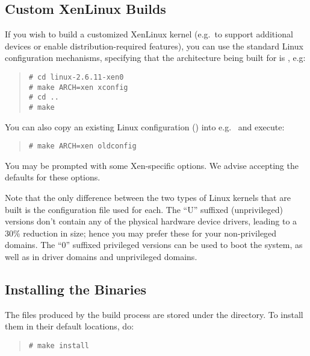 \subsection{Custom XenLinux Builds}


If you wish to build a customized XenLinux kernel (e.g.\ to support
additional devices or enable distribution-required features), you can
use the standard Linux configuration mechanisms, specifying that the
architecture being built for is , e.g:
\begin{quote}
\begin{verbatim}
# cd linux-2.6.11-xen0
# make ARCH=xen xconfig
# cd ..
# make
\end{verbatim}
\end{quote}

You can also copy an existing Linux configuration ()
into e.g.\  and execute:
\begin{quote}
\begin{verbatim}
# make ARCH=xen oldconfig
\end{verbatim}
\end{quote}

You may be prompted with some Xen-specific options. We advise
accepting the defaults for these options.

Note that the only difference between the two types of Linux kernels
that are built is the configuration file used for each.  The ``U''
suffixed (unprivileged) versions don't contain any of the physical
hardware device drivers, leading to a 30\% reduction in size; hence
you may prefer these for your non-privileged domains.  The ``0''
suffixed privileged versions can be used to boot the system, as well
as in driver domains and unprivileged domains.

\subsection{Installing the Binaries}

The files produced by the build process are stored under the
 directory. To install them in their default
locations, do:
\begin{quote}
\begin{verbatim}
# make install
\end{verbatim}
\end{quote}

